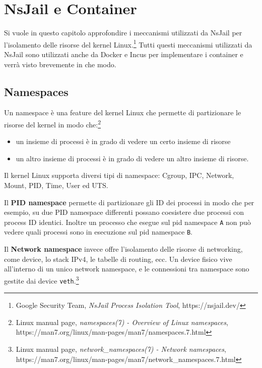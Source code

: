 \section{NsJail e Container}\label{nsjail-e-container}

Si vuole in questo capitolo approfondire i meccanismi utilizzati da
NsJail per l'isolamento delle risorse del kernel Linux.\footnote{\label{fn:ref_30}Google
  Security Team, \emph{NsJail Process Isolation Tool},
  https://nsjail.dev/} Tutti questi meccanismi utilizzati da NsJail sono
utilizzati anche da Docker e Incus per implementare i container e verrà
visto brevemente in che modo.

\subsection{Namespaces}\label{namespaces}

Un namespace è una feature del kernel Linux che permette di partizionare
le risorse del kernel in modo che:\footnote{\label{fn:ref_31}Linux manual page,
  \emph{namespaces(7) - Overview of Linux namespaces},
  https://man7.org/linux/man-pages/man7/namespaces.7.html}

\begin{itemize}
\tightlist
\item
  un insieme di processi è in grado di vedere un certo insieme di
  risorse
\item
  un altro insieme di processi è in grado di vedere un altro insieme di
  risorse.
\end{itemize}

Il kernel Linux supporta diversi tipi di namespace: Cgroup, IPC,
Network, Mount, PID, Time, User ed UTS.

Il \textbf{PID namespace} permette di partizionare gli ID dei processi
in modo che per esempio, su due PID namespace differenti possano
coesistere due processi con process ID identici. Inoltre un processo che
esegue sul pid namespace \passthrough{\lstinline!A!} non può vedere
quali processi sono in esecuzione sul pid namespace
\passthrough{\lstinline!B!}.

Il \textbf{Network namespace} invece offre l'isolamento delle risorse di
networking, come device, lo stack IPv4, le tabelle di routing, ecc. Un
device fisico vive all'interno di un unico network namespace, e le
connessioni tra namespace sono gestite dai device
\passthrough{\lstinline!veth!}.\footnote{\label{fn:ref_32}Linux manual page,
  \emph{network\_namespaces(7) - Network namespaces},
  https://man7.org/linux/man-pages/man7/network\_namespaces.7.html}

